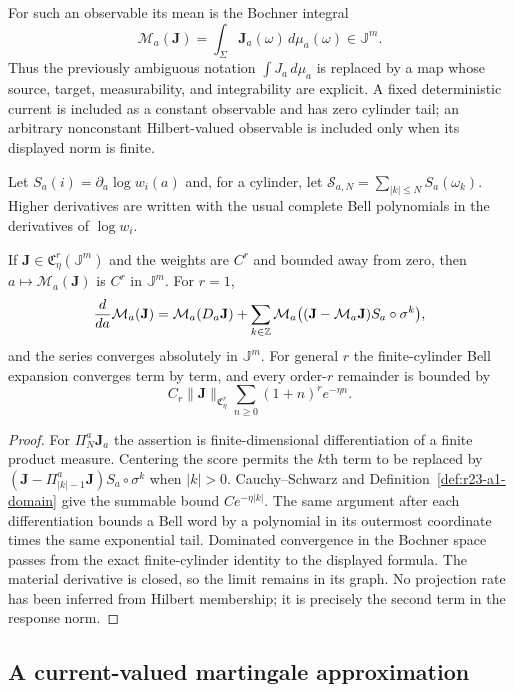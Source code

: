 For such an observable its mean is the Bochner integral
\[
 \mathcal M_a(\mathbf J)=\int_\Sigma\mathbf J_a(\omega)\,d\mu_a(\omega)
 \in\mathbb J^m.
\]
Thus the previously ambiguous notation $\int J_a\,d\mu_a$ is replaced by a
map whose source, target, measurability, and integrability are explicit.  A
fixed deterministic current is included as a constant observable and has zero
cylinder tail; an arbitrary nonconstant Hilbert-valued observable is included
only when its displayed norm is finite.

Let
$S_a(i)=\partial_a\log w_i(a)$ and, for a cylinder, let
$\mathscr S_{a,N}=\sum_{|k|\le N}S_a(\omega_k)$.  Higher derivatives are
written with the usual complete Bell polynomials in the derivatives of
$\log w_i$.

\begin{theorem}
\label{thm:r23-a1-response}
If $\mathbf J\in\mathfrak C_{\eta}^{r}(\mathbb J^m)$ and the weights are
$C^r$ and bounded away from zero, then
$a\mapsto\mathcal M_a(\mathbf J)$ is $C^r$ in $\mathbb J^m$.  For $r=1$,
\[
 {d\over da}\mathcal M_a(\mathbf J)
 =\mathcal M_a(D_a\mathbf J)
 +\sum_{k\in\mathbb Z}
   \mathcal M_a\bigl((\mathbf J-\mathcal M_a\mathbf J)
                    S_a\circ\sigma^k\bigr),
\]
and the series converges absolutely in $\mathbb J^m$.  For general $r$ the
finite-cylinder Bell expansion converges term by term, and every order-$r$
remainder is bounded by
\[
 C_r\|\mathbf J\|_{\mathfrak C_{\eta}^{r}}
 \sum_{n\ge0}(1+n)^r e^{-\eta n}.
\]
\end{theorem}

\begin{proof}
For $\Pi_N^a\mathbf J_a$ the assertion is finite-dimensional
differentiation of a finite product measure.  Centering the score permits the
$k$th term to be replaced by
$(\mathbf J-\Pi_{|k|-1}^a\mathbf J)S_a\circ\sigma^k$ when $|k|>0$.
Cauchy--Schwarz and Definition~\ref{def:r23-a1-domain} give the summable bound
$Ce^{-\eta|k|}$.  The same argument after each differentiation bounds a Bell
word by a polynomial in its outermost coordinate times the same exponential
tail.  Dominated convergence in the Bochner space passes from the exact
finite-cylinder identity to the displayed formula.  The material derivative
is closed, so the limit remains in its graph.  No projection rate has been
inferred from Hilbert membership; it is precisely the second term in the
response norm.
\end{proof}

\subsection{A current-valued martingale approximation}

